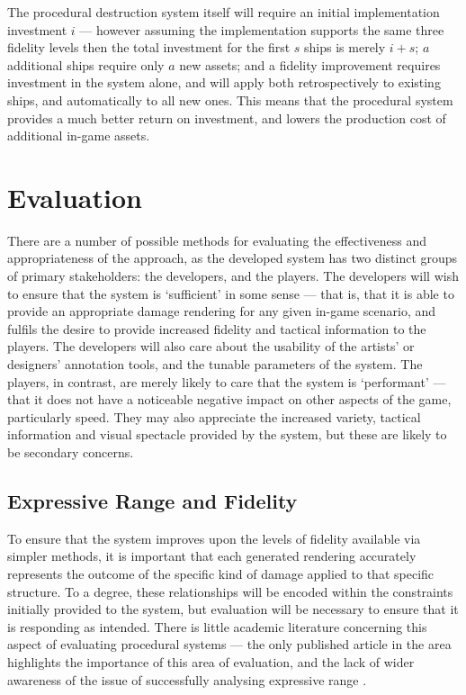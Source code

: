 \documentclass[11pt]{report}
\begin{document}
		The procedural destruction system itself will require an initial implementation investment $i$ --- however assuming the implementation supports the same three fidelity levels then the total investment for the first $s$ ships is merely $i + s$; $a$ additional ships require only $a$ new assets; and a fidelity improvement requires investment in the system alone, and will apply both retrospectively to existing ships, and automatically to all new ones. This means that the procedural system provides a much better return on investment, and lowers the production cost of additional in-game assets.

\chapter{Evaluation} \label{chap:eval}
	There are a number of possible methods for evaluating the effectiveness and appropriateness of the approach, as the developed system has two distinct groups of primary stakeholders: the developers, and the players. The developers will wish to ensure that the system is `sufficient' in some sense --- that is, that it is able to provide an appropriate damage rendering for any given in-game scenario, and fulfils the desire to provide increased fidelity and tactical information to the players. The developers will also care about the usability of the artists' or designers' annotation tools, and the tunable parameters of the system. The players, in contrast, are merely likely to care that the system is `performant' --- that it does not have a noticeable negative impact on other aspects of the game, particularly speed. They may also appreciate the increased variety, tactical information and visual spectacle provided by the system, but these are likely to be secondary concerns.

	\section{Expressive Range and Fidelity}
		To ensure that the system improves upon the levels of fidelity available via simpler methods, it is important that each generated rendering accurately represents the outcome of the specific kind of damage applied to that specific structure. To a degree, these relationships will be encoded within the constraints initially provided to the system, but evaluation will be necessary to ensure that it is responding as intended. There is little academic literature concerning this aspect of evaluating procedural systems --- the only published article in the area highlights the importance of this area of evaluation, and the lack of wider awareness of the issue of successfully analysing expressive range \cite{smith2010analyzing}.
\end{document}
